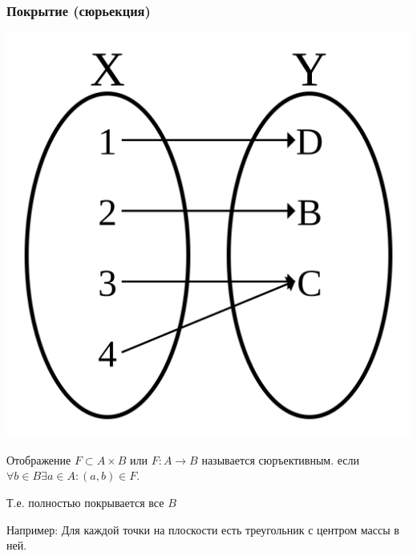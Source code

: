 \documentclass[letterpaper]{article}
\begin{document}
\subsubsection{Покрытие (сюрьекция)}
\label{sec:org96cfb7a}
\begin{center}
\includegraphics[width=.9\linewidth]{./src/surjection.png}
\end{center}
Отображение \(F \subset A \times B\) или \(F: A \rightarrow B\) называется сюръективным.
если \(\forall b \in B \exists a \in A: (a, b) \in F\).

Т.е. полностью покрывается все \(B\)

Например: Для каждой точки на плоскости есть треугольник с центром массы в ней.
\end{document}
